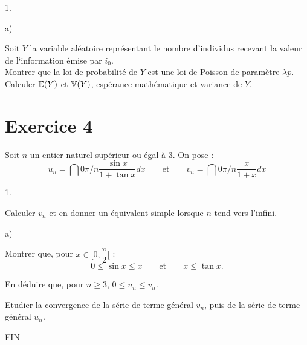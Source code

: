 \documentclass[11pt]{article}%
\begin{document}
\begin{noliste}{1.}
\begin{noliste}{a)}
\item Soit $Y$ la variable aléatoire représentant le nombre d'individus
recevant la valeur de l`information émise par $i_{0}$.\\
Montrer que la loi de probabilité de $Y$ est une loi de Poisson de
paramètre 
$\lambda p$.\\
Calculer $\mathbb{E}(Y)$ et $\mathbb{V}(Y)$, espérance mathématique et variance de $Y$.
\end{noliste}
\end{noliste}

\section*{Exercice 4}

Soit $n$ un entier naturel supérieur ou égal à 3. On pose : 
\[
u_{n} = \dint{0}{\pi /n}\dfrac{\sin x}{1 + \tan x}dx\qquad
\text{et}\qquad v_{n} = \dint{0}{\pi /n}\dfrac{x}{1 + x}dx
\]

\begin{noliste}{1.}
 \setlength{\itemsep}{4mm}
\item Calculer $v_{n}$ et en donner un équivalent simple lorsque $n$
tend
vers l'infini.

\item 

\begin{noliste}{a)}
 \setlength{\itemsep}{2mm}
\item Montrer que, pour $x\in \lbrack 0,\dfrac{\pi }{2}[$ : 
\[
0\leq \sin x\leq x\qquad \text{et}\qquad x\leq \tan x.
\]

\item En déduire que, pour $n\geq 3$, $0\leq u_{n}\leq v_{n}$.
\end{noliste}

\item Etudier la convergence de la série de terme général $v_{n}$, puis
de
la série de terme général $u_{n}$.
\end{noliste}

\begin{center}
FIN
\end{center}

\label{fin}
\end{document}
